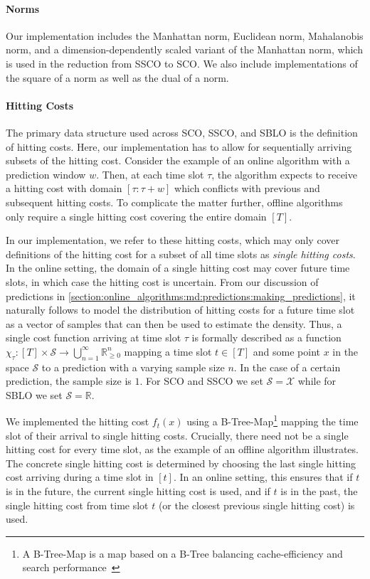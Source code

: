 \paragraph{Norms} Our implementation includes the Manhattan norm, Euclidean norm, Mahalanobis norm, and a dimension-dependently scaled variant of the Manhattan norm, which is used in the reduction from SSCO to SCO. We also include implementations of the square of a norm as well as the dual of a norm.

\paragraph{Hitting Costs} The primary data structure used across SCO, SSCO, and SBLO is the definition of hitting costs. Here, our implementation has to allow for sequentially arriving subsets of the hitting cost. Consider the example of an online algorithm with a prediction window $w$. Then, at each time slot $\tau$, the algorithm expects to receive a hitting cost with domain $[\tau : \tau + w]$ which conflicts with previous and subsequent hitting costs. To complicate the matter further, offline algorithms only require a single hitting cost covering the entire domain $[T]$.

In our implementation, we refer to these hitting costs, which may only cover definitions of the hitting cost for a subset of all time slots as \emph{single hitting costs}. In the online setting, the domain of a single hitting cost may cover future time slots, in which case the hitting cost is uncertain. From our discussion of predictions in \cref{section:online_algorithms:md:predictions:making_predictions}, it naturally follows to model the distribution of hitting costs for a future time slot as a vector of samples that can then be used to estimate the density. Thus, a single cost function arriving at time slot $\tau$ is formally described as a function $\chi_{\tau} : [T] \times \mathcal{S} \to \bigcup_{n=1}^{\infty} \mathbb{R}_{\geq 0}^n$ mapping a time slot $t \in [T]$ and some point $x$ in the space $\mathcal{S}$ to a prediction with a varying sample size $n$. In the case of a certain prediction, the sample size is $1$. For SCO and SSCO we set $\mathcal{S} = \mathcal{X}$ while for SBLO we set $\mathcal{S} = \mathbb{R}$.

We implemented the hitting cost $f_t(x)$ using a B-Tree-Map\footnote{A B-Tree-Map is a map based on a B-Tree balancing cache-efficiency and search performance~\cite{BTreeMap}} mapping the time slot of their arrival to single hitting costs. Crucially, there need not be a single hitting cost for every time slot, as the example of an offline algorithm illustrates. The concrete single hitting cost is determined by choosing the last single hitting cost arriving during a time slot in $[t]$. In an online setting, this ensures that if $t$ is in the future, the current single hitting cost is used, and if $t$ is in the past, the single hitting cost from time slot $t$ (or the closest previous single hitting cost) is used.

